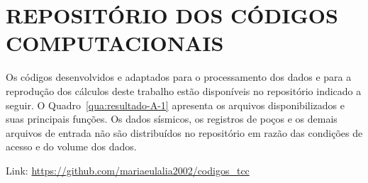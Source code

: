 \chapter{REPOSITÓRIO DOS CÓDIGOS COMPUTACIONAIS}\label{ap:codigos}
\setcounter{figure}{0}
\setcounter{table}{0}
\setcounter{quadro}{0}

Os códigos desenvolvidos e adaptados para o processamento dos dados e para a reprodução dos cálculos deste trabalho estão disponíveis no repositório indicado a seguir. O Quadro~\ref{qua:resultado-A-1} apresenta os arquivos disponibilizados e suas principais funções. Os dados sísmicos, os registros de poços e os demais arquivos de entrada não são distribuídos no repositório em razão das condições de acesso e do volume dos dados.

Link: \url{https://github.com/mariaeulalia2002/codigos_tcc}

